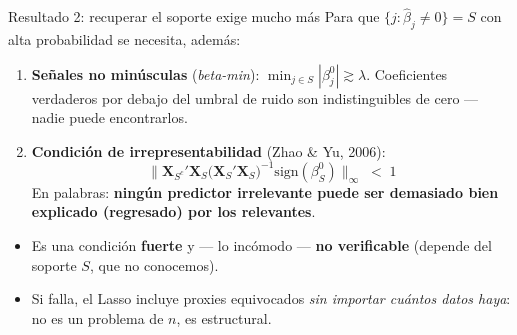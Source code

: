 \documentclass{beamer}
\newcommand{\1}{\mathbb{I}}
\newcommand{\sign}{\mathrm{sign}}
\begin{document}
\begin{frame}{Resultado 2: recuperar el soporte exige mucho más}
\small
Para que $\{j : \hat{\beta}_j \neq 0\} = S$ con alta probabilidad se necesita, además:
\pause
\begin{enumerate}\itemsep5pt
  \item \textbf{Señales no minúsculas} (\emph{beta-min}): $\min_{j \in S} |\beta^0_j| \gtrsim \lambda$. Coeficientes verdaderos por debajo del umbral de ruido son indistinguibles de cero --- nadie puede encontrarlos. \pause
  \item \textbf{Condición de irrepresentabilidad} (Zhao \& Yu, 2006):
  \[ \big\| \mathbf{X}_{S^c}'\mathbf{X}_S \big( \mathbf{X}_S'\mathbf{X}_S \big)^{-1} \sign(\beta^0_S) \big\|_\infty \;<\; 1 \]
  En palabras: \textbf{ningún predictor irrelevante puede ser demasiado bien explicado (regresado) por los relevantes}. \pause
\end{enumerate}

\vspace{0.15cm}
\begin{itemize}\itemsep4pt
  \item Es una condición \textbf{fuerte} y --- lo incómodo --- \textbf{no verificable} (depende del soporte $S$, que no conocemos).
  \item Si falla, el Lasso incluye proxies equivocados \emph{sin importar cuántos datos haya}: no es un problema de $n$, es estructural.
\end{itemize}
\end{frame}
\end{document}
